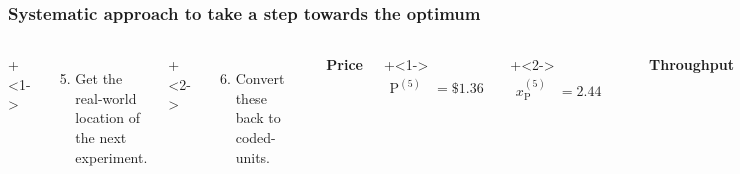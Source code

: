 \documentclass[handout,11pt,aspectratio=169,mathserif]{beamer}
\begin{document}
\begin{frame}\frametitle{Systematic approach to take a step towards the optimum}
	\begin{columns}[T]

			\vspace{1cm}
			\onslide+<1->{
				{\tiny 
					\begin{enumerate}\setcounter{enumi}{4}
						\item	Get the real-world location
						of the next experiment.
					\end{enumerate}
				
				\par}
			}
			
			\onslide+<2->{
				{\tiny 
					\begin{enumerate}\setcounter{enumi}{5}
						\item	Convert these back to coded-units.
					\end{enumerate}
				
				\par}
			}
			
				
			\rule[3mm]{0.01cm}{25mm}%
			
			
			\centerline{\textbf{Price}}
			
	
			\onslide+<1->{
				\begin{align*} 
					\text{P}^{(5)} &= \$1.36
				\end{align*}
			}
			
			\vspace{-1.1cm}
			\onslide+<2->{
				\begin{align*} 
					x_\text{P}^{(5)} &= 2.44
				\end{align*}
			}
			
			
			
		
			\rule[3mm]{0.01cm}{30mm}%
			
			\centerline{\textbf{Throughput}}
			
			\onslide+<1->{
				\begin{align*} 
					\text{T}^{(5)} &= 330 ~\text{parts per hour}
				\end{align*}
			}
			
			\vspace{-1.1cm}
			\onslide+<2->{	
				\begin{align*} 
					x_\text{T}^{(5)} &= 1.0
				\end{align*}
			}
	\end{columns}


\end{frame}
\end{document}
